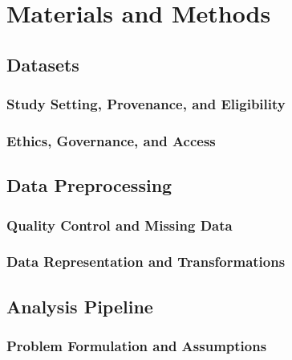 \chapter{Materials and Methods}
\label{ch:materials-methods}

\section{Datasets}
\subsection{Study Setting, Provenance, and Eligibility}
\subsection{Ethics, Governance, and Access}

\section{Data Preprocessing}
\subsection{Quality Control and Missing Data}
\subsection{Data Representation and Transformations}

\section{Analysis Pipeline}
\subsection{Problem Formulation and Assumptions}
